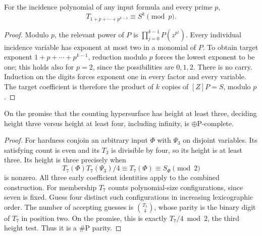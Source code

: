\begin{lemma}
For the incidence polynomial of any input formula and every prime $p$,
\[
 T_{1+p+\cdots+p^{k-1}}\equiv S^k\pmod p.
\]
\end{lemma}
\begin{proof}
Modulo $p$, the relevant power of $P$ is
$\prod_{j=0}^{k-1}P(z^{p^j})$.  Every individual incidence variable
has exponent at most two in a monomial of $P$.  To obtain target
exponent $1+p+\cdots+p^{k-1}$, reduction modulo $p$ forces the
lowest exponent to be one; this holds also for $p=2$, since the
possibilities are $0,1,2$.  There is no carry.  Induction on the
digits forces exponent one in every factor and every variable.
The target coefficient is therefore the product of $k$ copies of
$[Z]P=S$, modulo $p$.
\end{proof}

\begin{corollary}
On the promise that the counting hypersurface has height at least
three, deciding height three versus height at least four, including
infinity, is $\oplus\mathrm P$-complete.
\end{corollary}
\begin{proof}
For hardness conjoin an arbitrary input $\Phi$ with $\Psi_3$ on
disjoint variables.  Its satisfying count is even and its $T_3$ is
divisible by four, so its height is at least three.  Its height is
three precisely when
\[
 T_7(\Phi)T_7(\Psi_3)/4\equiv T_7(\Phi)
 \equiv S_\Phi\pmod2
\]
is nonzero.  All three early coefficient identities apply to the
combined construction.  For membership $T_7$ counts polynomial-size
configurations, since seven is fixed.  Guess four distinct such
configurations in increasing lexicographic order.  The number of
accepting guesses is $\binom{T_7}{4}$, whose parity is the binary
digit of $T_7$ in position two.  On the promise, this is exactly
$T_7/4\bmod2$, the third height test.  Thus it is a \#P parity.
\end{proof}

